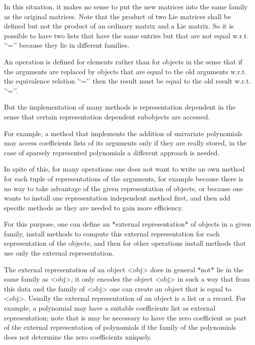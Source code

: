 In this situation, it makes no sense to put the new matrices into the
same family as the original matrices.
Note that the product of two Lie matrices shall be defined but not the
product of an ordinary matrix and a Lie matrix.
So it is possible to have two lists that have the same entries but that
are not equal w.r.t. '`='' because they lie in different families.



An operation is defined for elements rather than for objects in the sense
that if the arguments are replaced by objects that are equal to the old
arguments w.r.t. the equivalence relation '`='' then the result must be
equal to the old result w.r.t. '`=''.

But the implementation of many methods is representation dependent in the
sense that certain representation dependent subobjects are accessed.

For example, a method that implements the addition of univariate
polynomials may access coefficients lists of its arguments
only if they are really stored, 
in the case of sparsely represented polynomials a different approach is
needed.

In spite of this, for many operations one does not want to write an own
method for each tuple of representations of the arguments,
for example because there is no way to take advantage of the given
representation of objects,
or because one wants to install one representation independent method
first, and then add specific methods as they are needed to gain more
efficiency.

For this purpose,
one can define an *external representation* of objects in a given family,
install methods to compute this external representation for each
representation of the objects,
and then for other operations install methods that use only the external
representation.

The external representation of an object <obj> does in general *not* lie
in the same family as <obj>,
it only encodes the object <obj> in such a way that from this data and
the family of <obj> one can create an object that is equal to <obj>.
Usually the external representation of an object is a list or a record.
For example, a polynomial may have a suitable coefficients list as
external representation;
note that is may be necessary to have the zero coefficient as part of
the external representation of polynomials if the family of the
polynomials does not determine the zero coefficients uniquely.

